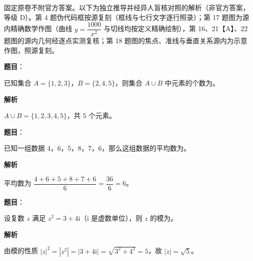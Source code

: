 

\begin{gktip}
固定原卷不附官方答案。以下为独立推导并经异人盲核对照的解析（非官方答案，等级 D）。第 4 题伪代码框按源复刻（框线与七行文字逐行照录）；第 17 题图为源内精确数学作图（曲线 \(y=\dfrac{1000}{x^{2}}\) 与切线均按定义精确绘制），第 16、21【A】、22 题图的源内几何经逐点实测复核；第 18 题图的焦点、准线与垂直关系源内为示意作图，照源复刻。
\end{gktip}

\begin{answer}

\textbf{题目}：

已知集合 \(A=\{1,2,3\}\)，\(B=\{2,4,5\}\)，则集合 \(A\cup B\) 中元素的个数为\gkblank{}。

\textbf{解析}

\(A\cup B=\{1,2,3,4,5\}\)，共 \(5\) 个元素。


\end{answer}
\begin{answer}

\textbf{题目}：

已知一组数据 4，6，5，8，7，6，那么这组数据的平均数为\gkblank{}。

\textbf{解析}

平均数为 \(\dfrac{4+6+5+8+7+6}{6}=\dfrac{36}{6}=6\)。


\end{answer}
\begin{answer}

\textbf{题目}：

设复数 \(z\) 满足 \(z^{2}=3+4\mathrm{i}\)（\(\mathrm{i}\) 是虚数单位），则 \(z\) 的模为\gkblank{}。

\textbf{解析}

由模的性质 \(|z|^{2}=|z^{2}|=|3+4\mathrm{i}|=\sqrt{3^{2}+4^{2}}=5\)，故 \(|z|=\sqrt{5}\)。


\end{answer}

